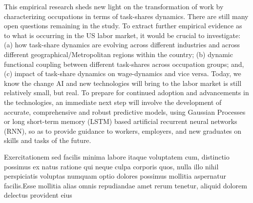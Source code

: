 \documentclass[letterpaper]{article} %
\begin{document}
\par  This empirical research sheds new light on the transformation of work by characterizing occupations in terms of task-shares dynamics. There are still many open questions remaining in the study. To extract further empirical evidence as to what is occurring in the US labor market, it would be crucial to investigate: (a) how task-share dynamics are evolving across different industries and across different geographical/Metropolitan regions within the country; (b) dynamic functional coupling between different task-shares across occupation groups; and, (c) impact of task-share dynamics on wage-dynamics and vice versa. Today, we know the change AI and new technologies will bring to the labor market is still relatively small, but real. To prepare for continued adoption and advancements in the technologies, an immediate next step will involve the development of accurate, comprehensive and robust predictive models, using Gaussian Processes or long short-term memory (LSTM) based artificial recurrent neural networks (RNN), so as to provide guidance to workers, employers, and new graduates on skills and tasks of the future.


  Exercitationem sed facilis minima labore itaque voluptatem cum, distinctio possimus ex natus ratione qui neque culpa corporis quos, nulla illo nihil perspiciatis voluptas numquam optio dolores possimus mollitia aspernatur facilis.Esse mollitia alias omnis repudiandae amet rerum tenetur, aliquid dolorem delectus provident eius

\end{document}
